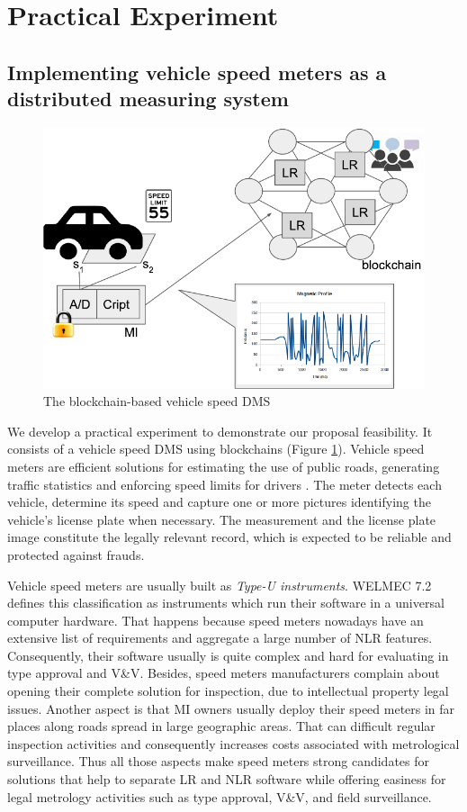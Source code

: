 \documentclass[journal]{IEEEtran}
\begin{document}
\section{Practical Experiment}

\subsection{Implementing vehicle speed meters as a distributed measuring system}

\begin{figure}[!t]
\centering
\includegraphics[width=.5\textwidth]{speedmeter} %
\caption{The blockchain-based vehicle speed DMS}
\label{f:speedmeter}
\end{figure}

We develop a practical experiment to demonstrate our proposal feasibility.
It consists of a vehicle speed DMS using blockchains (Figure \ref{f:speedmeter}).
Vehicle speed meters are efficient solutions for estimating the use of public roads, generating traffic statistics and enforcing speed limits for drivers \cite{Ki2006,S2011}.
The meter detects each vehicle, determine its speed and capture one or more pictures identifying the vehicle's license plate when necessary.
The measurement and the license plate image constitute the legally relevant record, which is expected to be reliable and protected against frauds.

Vehicle speed meters are usually built as \emph{Type-U instruments}. 
WELMEC 7.2 \cite{EuropeanCooperationinLegalMetrologyWELMEC2015} defines this classification as instruments which run their software in a universal computer hardware.
That happens because speed meters nowadays have an extensive list of requirements and aggregate a large number of NLR features.
Consequently, their software usually is quite complex and hard for evaluating in type approval and V\&V.
Besides, speed meters manufacturers complain about opening their complete solution for inspection, due to intellectual property legal issues.
Another aspect is that MI owners usually deploy their speed meters in far places along roads spread in large geographic areas.
That can difficult regular inspection activities and consequently increases costs associated with metrological surveillance.
Thus all those aspects make speed meters strong candidates for solutions that help to separate LR and NLR software while offering easiness for legal metrology activities such as type approval, V\&V, and field surveillance.
\end{document}
